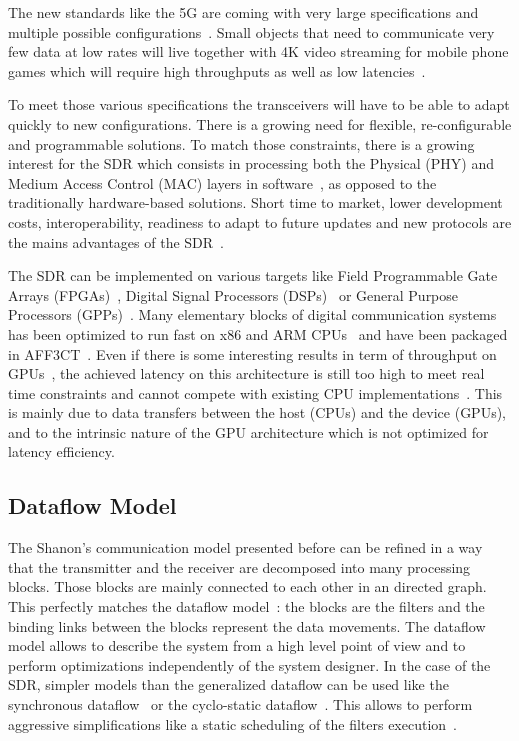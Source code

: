 The new standards like the 5G are coming with very large specifications and
multiple possible configurations~\cite{ETSI2018}. Small objects that need to
communicate very few data at low rates will live together with 4K video
streaming for mobile phone games which will require high throughputs as well as
low latencies~\cite{Rost2014}.

To meet those various specifications the transceivers will have to be able to
adapt quickly to new configurations. There is a growing need for flexible,
re-configurable and programmable solutions. To match those constraints, there is
a growing interest for the SDR which consists in processing both the Physical
(PHY) and Medium Access Control (MAC) layers in software~\cite{Mitola1993}, as
opposed to the traditionally hardware-based solutions. Short time to market,
lower development costs, interoperability, readiness to adapt to future updates
and new protocols are the mains advantages of the SDR~\cite{Akeela2018}.

The SDR can be implemented on various targets like Field Programmable Gate
Arrays (FPGAs)~\cite{Coulton2004,Skey2006,Dutta2010,Shaik2013,Maheshwarappa2015,
Nivin2016}, Digital Signal Processors (DSPs)~\cite{Kaur2008,Karlsson2013,
Shaik2013} or General Purpose Processors (GPPs)~\cite{Yoge2012,Bang2014,
Meshram2019,Grayver2020}. Many elementary blocks of digital communication
systems has been optimized to run fast on x86 and ARM
CPUs~\cite{Cassagne2015c,Cassagne2016a,Cassagne2016b,Cassagne2018,Leonardon2019,
Ghaffari2019} and have been packaged in AFF3CT~\cite{Cassagne2017a,
Cassagne2019a}. Even if there is some interesting results in term of throughput
on GPUs~\cite{Xianjun2013,Li2014,LeGal2014a,Giard2016b,Keskin2017a}, the
achieved latency on this architecture is still too high to meet real time
constraints and cannot compete with existing CPU
implementations~\cite{LeGal2015a,Cassagne2015c,Giard2016b,Cassagne2016a,
LeGal2017,Leonardon2019,LeGal2019a}. This is mainly due to data transfers
between the host (CPUs) and the device (GPUs), and to the intrinsic nature of
the GPU architecture which is not optimized for latency efficiency.

\subsection{Dataflow Model}

The Shanon's communication model presented before can be refined in a way
that the transmitter and the receiver are decomposed into many processing
blocks. Those blocks are mainly connected to each other in an directed graph.
This perfectly matches the dataflow model~\cite{Dennis1980,Ackerman1982}: the
blocks are the filters and the binding links between the blocks represent the
data movements. The dataflow model allows to describe the system from a high
level point of view and to perform optimizations independently of the system
designer. In the case of the SDR, simpler models than the generalized dataflow
can be used like the synchronous dataflow~\cite{Lee1987} or the cyclo-static
dataflow~\cite{Engels1994,Bilsen1995}. This allows to perform aggressive
simplifications like a static scheduling of the filters
execution~\cite{Parks1995}.


